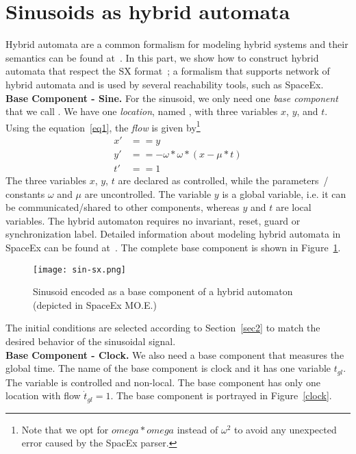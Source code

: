 \documentclass{article}
\begin{document}
\section{Sinusoids as hybrid automata}

Hybrid automata are a common formalism for modeling hybrid systems and their semantics can be found at~\cite{frehse2015introduction}. In this part, we show how to construct hybrid automata that respect the SX format~\cite{cotton2010spaceex}; a formalism that supports network of hybrid automata and is used by several reachability tools, such as SpaceEx. ~\\
\noindent \textbf{Base Component - Sine.} For the sinusoid, we only need one \emph{base component} that we call {}.
We have one \emph{location}, named {}, with three variables $x$, $y$, and $t$. Using the equation~\ref{eq1}, the {\emph{flow}} is given by\footnote{Note that we opt for $omega*omega$ instead of $\omega^2$  to avoid any unexpected error caused by the SpacEx parser.}
\begin{align*}
x' &== y \\
y' &== -\omega*\omega *(x-\mu * t)\\
t'&==1
\end{align*}
%
The three variables $x$, $y$, $t$ are declared as controlled, while the parameters~/ constants  $\omega$ and $\mu$ are uncontrolled. The variable $y$ is a global variable, i.e. it can be communicated/shared to other components, whereas $y$ and $t$ are local variables. The hybrid automaton requires no invariant, reset, guard or synchronization label. Detailed information about modeling hybrid automata in SpaceEx can be found at~\cite{SpaceEX}. The complete base component is shown in Figure~\ref{sin_sx}.

\begin{figure}[ht!]
\centering
\texttt{[image: sin-sx.png]}
\caption{Sinusoid encoded as a base component of a hybrid automaton (depicted in SpaceEx MO.E.)}
\label{sin_sx}
\end{figure}
%
The initial conditions are selected according to Section~\ref{sec2} to match the desired behavior of the sinusoidal signal.\\

\noindent \textbf{Base Component - Clock.}
We also need a base component that measures the global time. The name of the base component is {\sf clock} and it has one variable $t_{gl}$. The variable is controlled and non-local. The base component has only one location with flow $\dot{t}_{gl}=1$. The base component is portrayed in Figure~\ref{clock}.%
\end{document}

